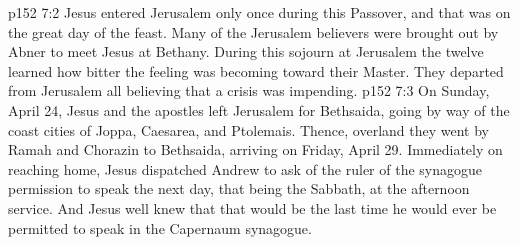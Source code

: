 \vs p152 7:2 Jesus entered Jerusalem only once during this Passover, and that was on the great day of the feast. Many of the Jerusalem believers were brought out by Abner to meet Jesus at Bethany. During this sojourn at Jerusalem the twelve learned how bitter the feeling was becoming toward their Master. They departed from Jerusalem all believing that a crisis was impending.
\vs p152 7:3 On Sunday, April 24, Jesus and the apostles left Jerusalem for Bethsaida, going by way of the coast cities of Joppa, Caesarea, and Ptolemais. Thence, overland they went by Ramah and Chorazin to Bethsaida, arriving on Friday, April 29. Immediately on reaching home, Jesus dispatched Andrew to ask of the ruler of the synagogue permission to speak the next day, that being the Sabbath, at the afternoon service. And Jesus well knew that that would be the last time he would ever be permitted to speak in the Capernaum synagogue.
